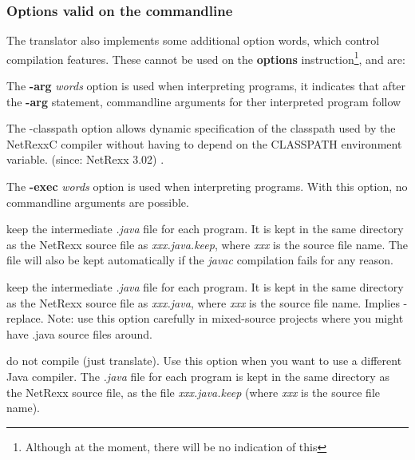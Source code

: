 \subsubsection{Options valid on the commandline}
The translator also implements some additional option words, which
control compilation features.  These cannot be used on the
\textbf{options} instruction\footnote{Although at the moment, there will be no indication of this}, and are:
\begin{description}
\item[-arg]
The \textbf{-arg} \emph{words} option is used when interpreting
programs, it indicates that after the \textbf{-arg} statement,
commandline arguments for ther interpreted program follow

\item[-classpath]
The -classpath option allows dynamic specification of the classpath
used by the NetRexxC compiler without having to depend on the
CLASSPATH environment variable. (since: NetRexx 3.02)
.
\item[-exec]
The \textbf{-exec} \emph{words} option is used when interpreting programs. With this option, no commandline arguments are possible.
\item[-keep]
keep the intermediate \emph{.java} file for each program.  It is kept in
the same directory as the NetRexx source file as \emph{xxx.java.keep},
where \emph{xxx} is the source file name.  The file will also be kept
automatically if the \emph{javac} compilation fails for any reason.
\item[-keepasjava]
keep the intermediate \emph{.java} file for each program.  It is kept in
the same directory as the NetRexx source file as \emph{xxx.java},
where \emph{xxx} is the source file name.  Implies -replace. Note: use this option carefully in mixed-source projects where you might have .java source files around.
\item[-nocompile]
do not compile (just translate).  Use this option when you want to use a
different Java compiler.  The \emph{.java} file for each program is kept
in the same directory as the NetRexx source file, as the
file \emph{xxx.java.keep} (where \emph{xxx} is the source file name).

\end{description}
